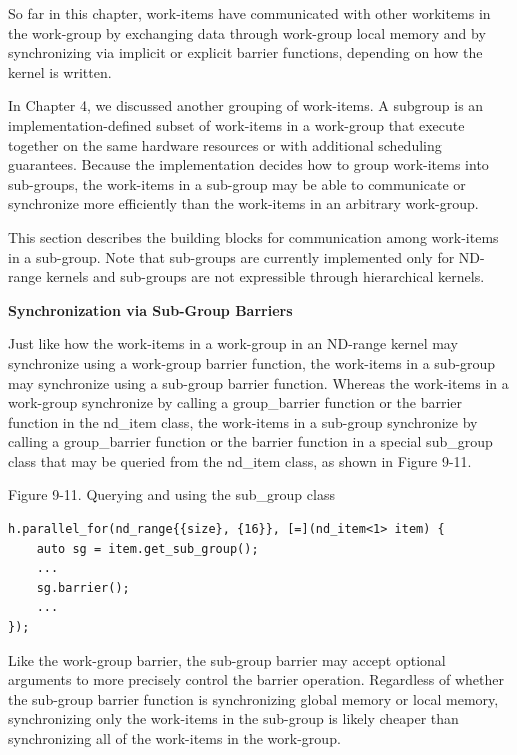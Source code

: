So far in this chapter, work-items have communicated with other workitems in the work-group by exchanging data through work-group local memory and by synchronizing via implicit or explicit barrier functions, depending on how the kernel is written.\par

In Chapter 4, we discussed another grouping of work-items. A subgroup is an implementation-defined subset of work-items in a work-group that execute together on the same hardware resources or with additional scheduling guarantees. Because the implementation decides how to group work-items into sub-groups, the work-items in a sub-group may be able to communicate or synchronize more efficiently than the work-items in an arbitrary work-group.\par

This section describes the building blocks for communication 
among work-items in a sub-group. Note that sub-groups are currently implemented only for ND-range kernels and sub-groups are not expressible through hierarchical kernels.\par

\hspace*{\fill} \par %
\textbf{Synchronization via Sub-Group Barriers}

Just like how the work-items in a work-group in an ND-range kernel may synchronize using a work-group barrier function, the work-items in a sub-group may synchronize using a sub-group barrier function. Whereas the work-items in a work-group synchronize by calling a group\_barrier function or the barrier function in the nd\_item class, the work-items in a sub-group synchronize by calling a group\_barrier function or the barrier function in a special sub\_group class that may be queried from the nd\_item class, as shown in Figure 9-11.\par

\hspace*{\fill} \par %
Figure 9-11. Querying and using the sub\_group class
\begin{lstlisting}[caption={}]
h.parallel_for(nd_range{{size}, {16}}, [=](nd_item<1> item) {
	auto sg = item.get_sub_group();
	...
	sg.barrier();
	...
});
\end{lstlisting}

Like the work-group barrier, the sub-group barrier may accept optional arguments to more precisely control the barrier operation. Regardless of whether the sub-group barrier function is synchronizing global memory or local memory, synchronizing only the work-items in the sub-group is likely cheaper than synchronizing all of the work-items in the work-group.\par

